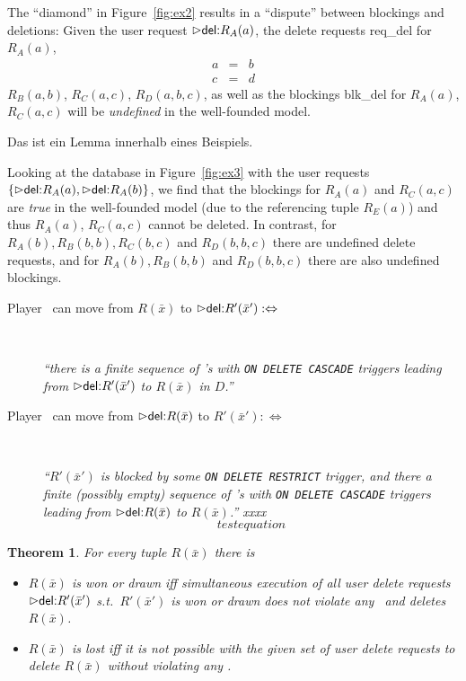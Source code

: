 \documentclass[twoside,11pt]{article}
\newtheorem{Theorem}{Theorem}
\theoremstyle{plain}
\begin{document}
\begin{Example}
  The ``diamond'' in Figure~\ref{fig:ex2} results in a ``dispute''
  between blockings and deletions: Given the user request $\extev \del
  R_A(a)$, the delete requests \textsf{req\_del} for $R_A(a)$,
  \begin{eqnarray}
    a &=& b \\
    c &=& d    
  \end{eqnarray}
  $R_B(a,b)$, $R_C(a,c)$, $R_D(a,b,c)$, as well as the blockings
  \textsf{blk\_del} for $R_A(a)$, $R_C(a,c)$ will be \emph{undefined}
  in the well-founded model.
\begin{Lemma}
Das ist ein Lemma innerhalb eines Beispiels.
\end{Lemma}
  Looking at the database in Figure~\ref{fig:ex3} with the user
  requests $\{\extev \del R_A(a), \extev \del R_A(b)\}$, we find that
  the blockings for $R_A(a)$ and $R_C(a,c)$ are \emph{true} in the
  well-founded model (due to the referencing tuple $R_E(a)$) and thus
  $R_A(a)$, $R_C(a,c)$ cannot be deleted. In contrast, for
  $R_A(b), R_B(b,b), R_C(b,c)$ and $R_D(b,b,c)$ there are undefined
  delete requests, and for $R_A(b), R_B(b,b)$ and $R_D(b,b,c)$ there
  are also undefined blockings.
\end{Example}
\begin{Definition}
\begin{description}
\item[Player \I\ can move from $R(\bar x)$ to $\extev \del R'(\bar x'):
  \Leftrightarrow$]\
  
  \emph{``there is a finite sequence of \ric's with \texttt{ON DELETE
      CASCADE} triggers leading from $\extev \del R'(\bar x')$ to
    $R(\bar x)$ in $D$.''}
\item[Player \II\ can move from $\extev \del R(\bar x)$ to $R'(\bar
  x'):\Leftrightarrow$]\ 
  
  \emph{``$R'(\bar x')$ is blocked by some \texttt{ON DELETE RESTRICT}
    trigger, and there a finite (possibly empty) sequence of \ric's
    with \texttt{ON DELETE CASCADE} triggers leading from $\extev \del
    R(\bar x)$ to $R(\bar x)$.'' xxxx}
\begin{equation}
  testequation    
\end{equation}
\end{description}
\end{Definition}

\begin{Theorem}\label{theo:game}
For every tuple $R(\bar x)$ there is
\begin{itemize}
\item $R(\bar x)$ is won or drawn iff simultaneous execution of
all user delete requests $\extev \del R'(\bar x')$ s.t.\ $R'(\bar x')$
is won or drawn does not violate any \ric\ and deletes $R(\bar x)$.
\item $R(\bar x)$ is lost iff it is not possible with the given set
of user delete requests to delete $R(\bar x)$ without violating any
\ric.
\end{itemize}
\end{Theorem}
\end{document}
